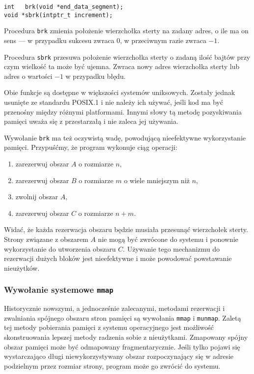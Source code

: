 \documentclass[12pt,a4paper,titlepage,twoside]{mwart}
\begin{document}
\vspace{4ex}

\begin{lstlisting}[caption={Prototypy procedur \texttt{brk} i \texttt{sbrk}.}]
int   brk(void *end_data_segment);
void *sbrk(intptr_t increment);
\end{lstlisting}

Procedura \texttt{brk} zmienia położenie wierzchołka sterty na zadany adres, o
ile ma on sens --- w przypadku sukcesu zwraca $0$, w przeciwnym razie zwraca $-1$.

Procedura \texttt{sbrk} przesuwa położenie wierzchołka sterty o zadaną ilość
bajtów przy czym wielkość ta może być ujemna. Zwraca nowy adres wierzchołka
sterty lub adres o wartości $-1$ w przypadku błędu.

Obie funkcje są dostępne w większości systemów uniksowych. Zostały jednak
usunięte ze standardu POSIX.1 i nie należy ich używać, jeśli kod ma być
przenośny między różnymi platformami. Innymi słowy tą metodę pozyskiwania
pamięci uważa się z przestarzałą i nie zaleca jej używania.

Wywołanie \texttt{brk} ma też oczywistą wadę, powodującą nieefektywne
wykorzystanie pamięci. Przypuśćmy, że program wykonuje ciąg operacji:

\begin{enumerate}
\item zarezerwuj obszar $A$ o rozmiarze $n$,
\item zarezerwuj obszar $B$ o rozmiarze $m$ o wiele mniejszym niż $n$,
\item zwolnij obszar $A$,
\item zarezerwuj obszar $C$ o rozmiarze $n + m$.
\end{enumerate}

Widać, że każda rezerwacja obszaru będzie musiała przesunąć wierzchołek sterty.
Strony związane z obszarem $A$ nie mogą być zwrócone do systemu i ponownie
wykorzystanie do utworzenia obszaru $C$. Używanie tego mechanizmu do rezerwacji
dużych bloków jest nieefektywne i może powodować powstawanie nieużytków.

\subsubsection{Wywołanie systemowe \texttt{mmap}}

Historycznie nowszymi, a jednocześnie zalecanymi, metodami rezerwacji i
zwalniania spójnego obszaru stron pamięci są wywołania \texttt{mmap} i
\texttt{munmap}. Zaletą tej metody pobierania pamięci z systemu operacyjnego
jest możliwość skonstruowania lepszej metody radzenia sobie z nieużytkami.
Zmapowany spójny obszar pamięci może być odmapowany fragmentarycznie. Jeśli
tylko pojawi się wystarczająco długi niewykorzystywany obszar rozpoczynający
się w adresie podzielnym przez rozmiar strony, program może go zwrócić do
systemu. 
\end{document}
